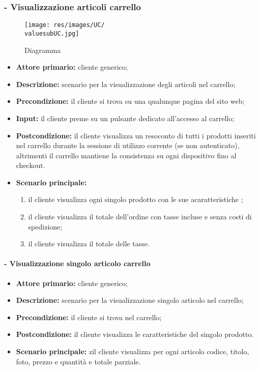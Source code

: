 \subsubsection{ - Visualizzazione articoli carrello}
\begin{figure}[H]
    \centering
    \texttt{[image: res/images/UC/\\valuesubUC.jpg]}
    \caption{Diagramma }
\end{figure}
\begin{itemize}
    \item \textbf{Attore primario:} cliente generico;
    \item \textbf{Descrizione:} scenario per la visualizzazione degli articoli nel carrello;
    \item \textbf{Precondizione:} il cliente si trova su una qualunque pagina del sito web;
    \item \textbf{Input:} il cliente preme su un pulsante dedicato all'accesso al carrello;
    \item \textbf{Postcondizione:} il cliente visualizza un resoconto di tutti i prodotti inseriti nel carrello durante la sessione di utilizzo corrente (se non autenticato), altrimenti il carrello mantiene la consistenza su ogni dispositivo fino al checkout.
    \item \textbf{Scenario principale:}
          \begin{enumerate}
              \item il cliente visualizza ogni singolo prodotto con le sue acaratteristiche ;
              \item il cliente visualizza il totale dell'ordine con tasse incluse e senza costi di spedizione;
              \item il cliente visualizza il totale delle tasse.
          \end{enumerate}
\end{itemize}

\stepsubsubUserCase
\paragraph{ - Visualizzazione singolo articolo carrello}
\begin{itemize}
    \item \textbf{Attore primario:} cliente generico;
    \item \textbf{Descrizione:} scenario per la visualizzazione singolo articolo nel carrello;
    \item \textbf{Precondizione:} il cliente si trova nel carrello;
    \item \textbf{Postcondizione:} il cliente visualizza le caratteristiche del singolo prodotto.
    \item \textbf{Scenario principale:} zil cliente visualizza per ogni articolo codice, titolo, foto, prezzo e quantità e totale parziale.
\end{itemize}


